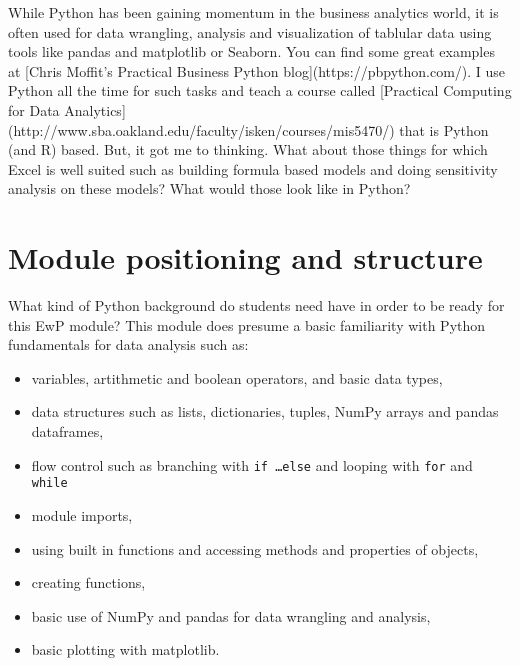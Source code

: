\documentclass[ited,blindrev]{informs3}              %
\begin{document}
While Python has been gaining momentum in the business analytics world, it is often used for data wrangling, analysis and visualization of tablular data using tools like pandas and matplotlib or Seaborn. You can find some great examples at [Chris Moffit's Practical Business Python blog](https://pbpython.com/). I use Python all the time for such tasks and teach a course called [Practical Computing for Data Analytics](http://www.sba.oakland.edu/faculty/isken/courses/mis5470/) that is Python (and R) based. But, it got me to thinking. What about those things for which Excel is well suited such as building formula based models and doing sensitivity analysis on these models? What would those look like in Python?

\section{Module positioning and structure}

What kind of Python background do students need have in order to be ready for this EwP module? This module does presume a basic familiarity with Python fundamentals for data analysis such as:

\begin{itemize}
	\item variables, artithmetic and boolean operators, and basic data types,
	\item data structures such as lists, dictionaries, tuples, NumPy arrays and pandas dataframes,
	\item flow control such as branching with \texttt{if \ldots else} and looping with \texttt{for} and \texttt{while}
	\item module imports,
	\item using built in functions and accessing methods and properties of objects,
	\item creating functions,
	\item basic use of NumPy and pandas for data wrangling and analysis,
	\item basic plotting with matplotlib.
\end{itemize}
\end{document}
